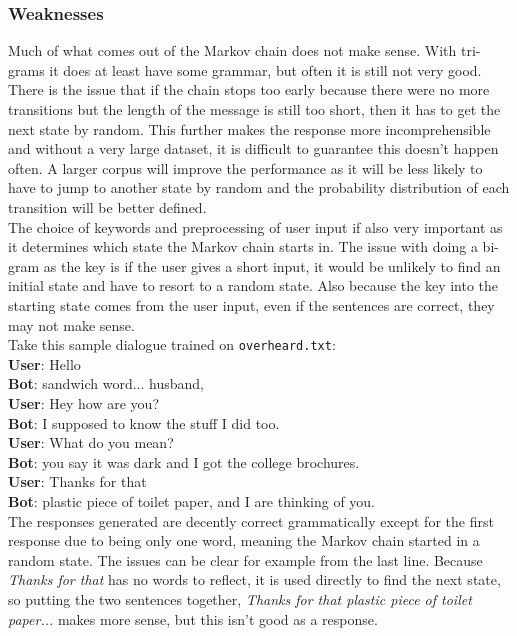 \documentclass{article}
\newcommand{\n}[0]{\\[\baselineskip]}
\begin{document}
\subsubsection{Weaknesses}
Much of what comes out of the Markov chain does not make sense. With tri-grams it does at least have some grammar, but often it is still not very good. There is the issue that if the chain stops too early because there were no more transitions but the length of the message is still too short, then it has to get the next state by random. This further makes the response more incomprehensible and without a very large dataset, it is difficult to guarantee this doesn't happen often. A larger corpus will improve the performance as it will be less likely to have to jump to another state by random and the probability distribution of each transition will be better defined.
\n
The choice of keywords and preprocessing of user input if also very important as it determines which state the Markov chain starts in. The issue with doing a bi-gram as the key is if the user gives a short input, it would be unlikely to find an initial state and have to resort to a random state. Also because the key into the starting state comes from the user input, even if the sentences are correct, they may not make sense. 
\n
Take this sample dialogue trained on \texttt{overheard.txt}:
\n
\textbf{User}: Hello
\\ \textbf{Bot}: sandwich word... husband,
\\ \textbf{User}: Hey how are you?
\\ \textbf{Bot}: I supposed to know the stuff I did too.
\\ \textbf{User}: What do you mean?
\\ \textbf{Bot}: you say it was dark and I got the college brochures.
\\ \textbf{User}: Thanks for that
\\ \textbf{Bot}: plastic piece of toilet paper, and I are thinking of you.
\n
The responses generated are decently correct grammatically except for the first response due to being only one word, meaning the Markov chain started in a random state. The issues can be clear for example from the last line. Because \textit{Thanks for that} has no words to reflect, it is used directly to find the next state, so putting the two sentences together, \textit{Thanks for that plastic piece of toilet paper...} makes more sense, but this isn't good as a response.
\end{document}
